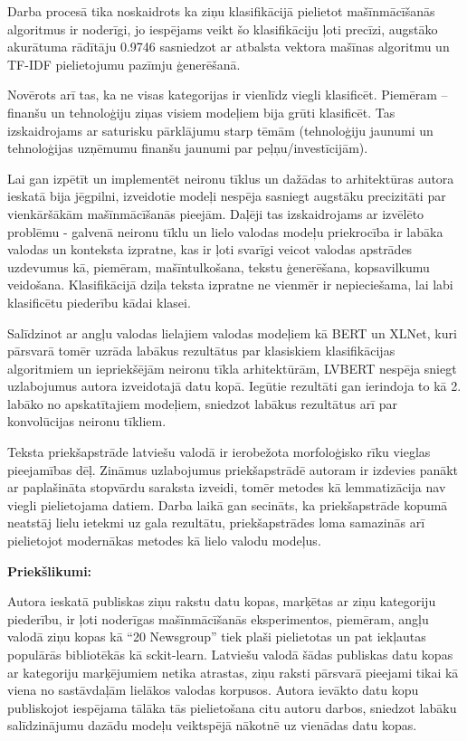 Darba procesā tika noskaidrots ka ziņu klasifikācijā pielietot mašīnmācīšanās algoritmus ir noderīgi, jo iespējams veikt šo klasifikāciju ļoti precīzi, augstāko akurātuma rādītāju 0.9746 sasniedzot ar atbalsta vektora mašīnas algoritmu un TF-IDF pielietojumu pazīmju ģenerēšanā.

Novērots arī tas, ka ne visas kategorijas ir vienlīdz viegli klasificēt. Piemēram – finanšu un tehnoloģiju ziņas visiem modeļiem bija grūti klasificēt. Tas izskaidrojams ar saturisku pārklājumu starp tēmām (tehnoloģiju jaunumi un tehnoloģijas uzņēmumu finanšu jaunumi par peļņu/investīcijām).

Lai gan izpētīt un implementēt neironu tīklus un dažādas to arhitektūras autora ieskatā bija jēgpilni, izveidotie modeļi nespēja sasniegt augstāku precizitāti par vienkāršākām mašīnmācīšanās pieejām. Daļēji tas izskaidrojams ar izvēlēto problēmu - galvenā neironu tīklu un lielo valodas modeļu priekrocība ir labāka valodas un konteksta izpratne, kas ir ļoti svarīgi veicot valodas apstrādes uzdevumus kā, piemēram, mašīntulkošana, tekstu ģenerēšana, kopsavilkumu veidošana. Klasifikācijā dziļa teksta izpratne ne vienmēr ir nepieciešama, lai labi klasificētu piederību kādai klasei. 

Salīdzinot ar angļu valodas lielajiem valodas modeļiem kā BERT un XLNet, kuri pārsvarā tomēr uzrāda labākus rezultātus par klasiskiem klasifikācijas algoritmiem un iepriekšējām neironu tīkla arhitektūrām, LVBERT nespēja sniegt uzlabojumus autora izveidotajā datu kopā. Iegūtie rezultāti gan ierindoja to kā 2. labāko no apskatītajiem modeļiem, sniedzot labākus rezultātus arī par konvolūcijas neironu tīkliem.

Teksta priekšapstrāde latviešu valodā ir ierobežota morfoloģisko rīku vieglas pieejamības dēļ. Zināmus uzlabojumus priekšapstrādē autoram ir izdevies panākt ar paplašināta stopvārdu saraksta izveidi, tomēr metodes kā lemmatizācija nav viegli pielietojama datiem. Darba laikā gan secināts, ka priekšapstrāde kopumā neatstāj lielu ietekmi uz gala rezultātu, priekšapstrādes loma samazinās arī pielietojot modernākas metodes kā lielo valodu modeļus.

\pagebreak

\textbf {Priekšlikumi:}

Autora ieskatā publiskas ziņu rakstu datu kopas, marķētas ar ziņu kategoriju piederību, ir ļoti noderīgas mašīnmācīšanās eksperimentos, piemēram, angļu valodā ziņu kopas kā “20 Newsgroup” tiek plaši pielietotas un pat iekļautas populārās bibliotēkās kā sckit-learn. Latviešu valodā šādas publiskas datu kopas ar kategoriju marķējumiem netika atrastas, ziņu raksti pārsvarā pieejami tikai kā viena no sastāvdaļām lielākos valodas korpusos. Autora ievākto datu kopu publiskojot iespējama tālāka tās pielietošana citu autoru darbos, sniedzot labāku salīdzinājumu dazādu modeļu veiktspējā nākotnē uz vienādas datu kopas.

